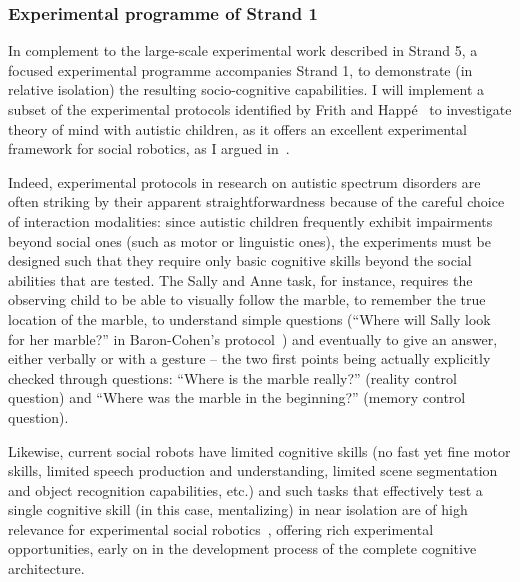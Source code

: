 \subsubsection{Experimental programme of Strand 1}

In complement to the large-scale experimental work described in Strand 5, a focused experimental programme accompanies Strand 1, to demonstrate (in relative
isolation) the resulting socio-cognitive capabilities. I will implement a subset
of the experimental protocols identified by Frith and
Happé~\parencite{frith1994autism} to investigate theory of mind with autistic
children, as it offers an excellent experimental framework for social
robotics, as I argued in~\parencite{lemaignan2015mutual}.

Indeed, experimental protocols in research on autistic spectrum disorders are often
striking by their apparent straightforwardness because of the careful choice of
interaction modalities: since autistic children frequently exhibit impairments
beyond social ones (such as motor or linguistic ones), the experiments must be
designed such that they require only basic cognitive skills beyond the social
abilities that are tested. The Sally and Anne task, for instance, requires the
observing child to be able to visually follow the marble, to remember the true
location of the marble, to understand simple questions (``Where will Sally look
for her marble?'' in Baron-Cohen's protocol~\parencite{baron1985does}) and eventually
to give an answer, either verbally or with a gesture -- the two first points
being actually explicitly checked through questions: ``Where is the marble
really?'' (reality control question) and ``Where was the marble in the
beginning?'' (memory control question).

Likewise, current social robots have limited cognitive skills (no fast yet fine
motor skills, limited speech production and understanding, limited scene
segmentation and object recognition capabilities, etc.) and such tasks that
effectively test a single cognitive skill (in this case, mentalizing) in near
isolation are of high relevance for experimental social
robotics~\parencite{lemaignan2015mutual}, offering rich experimental
opportunities, early on in the development process of the complete cognitive
architecture.

